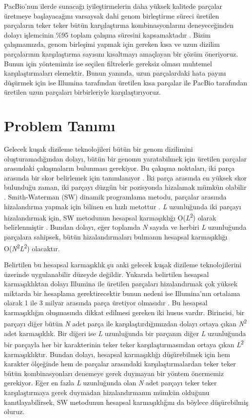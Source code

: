 PacBio'nun ilerde sunacağı iyileştirmelerin daha yüksek kalitede parçalar üretmeye başlayacağını varsaysak dahi genom birleştirme süreci üretilen parçaların teker teker bütün karşılaştırma kombinasyonlarını deneyeceğinden dolayı işlemcinin \%95 toplam çalışma süresini kapsamaktadır \cite{berlin}. Bizim çalışmamızda, genom birleşimi yapmak için gereken kısa ve uzun dizilim parçalarının karşılaştırma sayısını kısaltmayı amaçlayan bir çözüm öneriyoruz. Bunun için yöntemimiz ise seçilen filtrelerle gereksiz olması muhtemel karşılaştırmaları elemektir. Bunun yanında, uzun parçalardaki hata payını düşürmek için ise Illumina tarafından üretilen kısa parçalar ile PacBio tarafından üretilen uzun parçaları birbirleriyle karşılaştırıyoruz.

\section{Problem Tanımı}

Gelecek kuşak dizileme teknolojileri bütün bir genom dizilimini oluşturamadığından dolayı, bütün bir genomu yaratabilmek için üretilen parçalar arasındaki çakışmaların bulunması gerekiyor. Bu çakışma noktaları, iki parça arasında bir skor belirlemek için tanımlanıyor \cite{staden}. İki parça arasında en yüksek skor bulunduğu zaman, iki parçayı düzgün bir pozisyonda hizalamak mümkün olabilir \cite{staden}. Smith-Waterman (SW) dinamik programlama metodu, parçalar arasında hizalandırma yapmak için bilinen en hızlı metottur \cite{smith}. \textit{L} uzunluğunda iki parçayı hizalandırmak için, SW metodunun hesapsal karmaşıklığı O(\textit{L}\textsuperscript{2}) olarak belirlenmiştir \cite{smith}. Bundan dolayı, eğer toplamda \textit{N} sayıda ve herbiri \textit{L} uzunluğunda parçalara sahipsek, bütün hizalandırmaları bulmanın hesapsal karmaşıklığı O(\textit{N}\textsuperscript{2}\textit{L}\textsuperscript{2}) olacaktır.

Belirtilen bu hesapsal karmaşıklık şu anki gelecek kuşak dizileme teknolojilerini üzerinde uygulanabilir düzeyde değildir. Yukarıda belirtilen hesapsal karmaşıklıktan dolayı Illumina ile üretilen parçaları hizalandırmak çok yüksek miktarda bir hesaplama gerektirecektir bunun nedeni ise Illumina'nın ortalama olarak 1 ile 3 milyar arasında parça üretiyor olmasıdır \cite{Metzker2010}. Bu hesapsal karmaşıklığın oluşmasında dikkat edilmesi gereken iki husus vardır. Birincisi, bir parçayı diğer bütün \textit{N} adet parça ile karşılaştırdığımızdan dolayı ortaya çıkan \textit{N}\textsuperscript{2} adet karmaşıklık. Bir diğeri ise \textit{L} uzunluğunda bir parçanın diğer \textit{L} uzunluğunda bir parçayla her bir karakterinin teker teker karşılaştırmasından ortaya çıkan \textit{L}\textsuperscript{2} karmaşıklıktır. Bundan dolayı, hesapsal karmaşıklığı düşürebilmek için hem karakter ölçeğinde hem de parçalar arasındaki karşılaştırmalardan teker teker bütün kombinasyonları denemeye gerek duymayan bir yöntem önermemiz gerekiyor. Eğer en fazla \textit{L} uzunluğunda olan \textit{N} adet parçayı teker teker karşılaştırmaya gerek duymadan hizalandırmanın mümkün olduğunu kanıtlayabilirsek, SW metodunun hesapsal karmaşıklığını da böylece düşürebilmiş oluruz.

